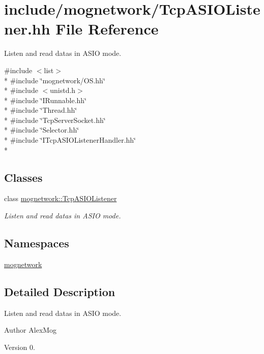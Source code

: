 \hypertarget{_tcp_a_s_i_o_listener_8hh}{\section{include/mognetwork/\-Tcp\-A\-S\-I\-O\-Listener.hh File Reference}
\label{_tcp_a_s_i_o_listener_8hh}
}


Listen and read datas in A\-S\-I\-O mode.  


{\ttfamily \#include $<$list$>$}\\*
{\ttfamily \#include \char`\"{}mognetwork/\-O\-S.\-hh\char`\"{}}\\*
{\ttfamily \#include $<$unistd.\-h$>$}\\*
{\ttfamily \#include \char`\"{}I\-Runnable.\-hh\char`\"{}}\\*
{\ttfamily \#include \char`\"{}Thread.\-hh\char`\"{}}\\*
{\ttfamily \#include \char`\"{}Tcp\-Server\-Socket.\-hh\char`\"{}}\\*
{\ttfamily \#include \char`\"{}Selector.\-hh\char`\"{}}\\*
{\ttfamily \#include \char`\"{}I\-Tcp\-A\-S\-I\-O\-Listener\-Handler.\-hh\char`\"{}}\\*
\subsection*{Classes}
\begin{DoxyCompactItemize}
\item 
class \hyperlink{classmognetwork_1_1_tcp_a_s_i_o_listener}{mognetwork\-::\-Tcp\-A\-S\-I\-O\-Listener}
\begin{DoxyCompactList}\small\item\em Listen and read datas in A\-S\-I\-O mode. \end{DoxyCompactList}\end{DoxyCompactItemize}
\subsection*{Namespaces}
\begin{DoxyCompactItemize}
\item 
\hyperlink{namespacemognetwork}{mognetwork}
\end{DoxyCompactItemize}


\subsection{Detailed Description}
Listen and read datas in A\-S\-I\-O mode. \begin{DoxyAuthor}{Author}
Alex\-Mog 
\end{DoxyAuthor}
\begin{DoxyVersion}{Version}
0. 
\end{DoxyVersion}
